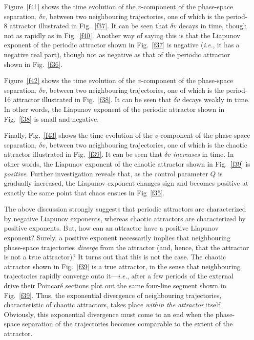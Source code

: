 Figure~\ref{f41} shows the time evolution of the $v$-component of the phase-space
separation, $\delta v$, between two neighbouring trajectories, one of which is the period-8
attractor illustrated in Fig.~\ref{f37}. It can be seen that $\delta v$ decays in time,
though not as rapidly as in Fig.~\ref{f40}. Another way of saying this is that the
Liapunov exponent of the periodic  attractor shown in Fig.~\ref{f37} 
is negative ({\em i.e.}, it has a negative real part),
though not as negative as that of the periodic attractor shown in Fig.~\ref{f36}.

Figure~\ref{f42} shows the time evolution of the $v$-component of the phase-space
separation, $\delta v$, between two neighbouring trajectories, one of which is the period-16
attractor illustrated in Fig.~\ref{f38}. It can be seen that $\delta v$ decays weakly in
time. In other words, the Liapunov exponent of the periodic attractor shown in Fig.~\ref{f38} is
small and negative. 

Finally, Fig.~\ref{f43} shows the time evolution of the $v$-component of the phase-space
separation, $\delta v$, between two neighbouring trajectories, one of which is the chaotic
attractor illustrated in Fig.~\ref{f39}. It can be seen that $\delta v$ {\em increases}   in
time. In other words, the  Liapunov exponent of the chaotic attractor shown in Fig.~\ref{f39} is
{\em positive}. Further investigation reveals that, as the control parameter $Q$
is gradually increased, the Liapunov exponent changes sign and becomes positive at exactly the same
point that chaos ensues in Fig~\ref{f35}. 

The above discussion strongly suggests that periodic attractors are characterized by negative
Liapunov exponents, whereas chaotic attractors are characterized by positive exponents.
But, how can an attractor have a positive Liapunov exponent? Surely, a positive
exponent necessarily implies that neighbouring phase-space trajectories {\em diverge}
from the attractor (and, hence, that the attractor is not a true attractor)? 
It turns out that this is not the case. The chaotic attractor
shown in Fig.~\ref{f39} is a true attractor, in the sense that neighbouring trajectories
rapidly converge onto it---{\em i.e.}, after a few periods of the external drive
their Poincar\'{e} sections plot out the same four-line segment shown in Fig.~\ref{f39}. 
Thus, the exponential divergence of neighbouring trajectories, characteristic of chaotic
attractors, takes place {\em within the attractor} itself. Obviously, this exponential divergence
must come to an end when the phase-space separation of the trajectories becomes comparable to the 
extent of the attractor.

